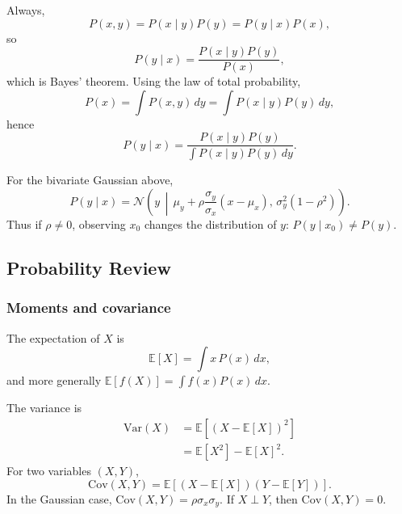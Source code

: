 \documentclass[11pt, titlepage]{article} %
\numberwithin{equation}{section}
\theoremstyle{definition}
\numberwithin{assumption}{section}
\begin{document}
Always,
\begin{equation*}
    P(x,y)=P(x\mid y)P(y)=P(y\mid x)P(x),
\end{equation*}
so
\begin{equation*}
    P(y\mid x)=\frac{P(x\mid y)P(y)}{P(x)},
\end{equation*}
which is Bayes' theorem. Using the law of total probability,
\begin{equation*}
    P(x)=\int P(x,y)\,dy=\int P(x\mid y)P(y)\,dy,
\end{equation*}
hence
\begin{equation*}
    P(y\mid x)=\frac{P(x\mid y)P(y)}{\int P(x\mid y)P(y)\,dy}.
\end{equation*}

For the bivariate Gaussian above,
\begin{equation*}
    P(y\mid x)=
    \mathcal{N}\!\left(
    y \,\middle|\,
    \mu_y+\rho\frac{\sigma_y}{\sigma_x}(x-\mu_x),\,
    \sigma_y^2(1-\rho^2)
    \right).
\end{equation*}
Thus if $\rho\ne 0$, observing $x_0$ changes the distribution of $y$: $P(y\mid x_0)\ne P(y)$.

\subsection{Probability Review}

\subsubsection*{Moments and covariance}

The expectation of $X$ is
\begin{equation*}
    \mathbb{E}[X]=\int x\,P(x)\,dx,
\end{equation*}
and more generally $\mathbb{E}[f(X)]=\int f(x)P(x)\,dx$.

The variance is
\begin{align*}
    \mathrm{Var}(X)
    &=\mathbb{E}\!\left[(X-\mathbb{E}[X])^2\right]\\
    &=\mathbb{E}[X^2]-\mathbb{E}[X]^2.
\end{align*}
For two variables $(X,Y)$,
\begin{equation*}
    \mathrm{Cov}(X,Y)=\mathbb{E}\!\left[(X-\mathbb{E}[X])(Y-\mathbb{E}[Y])\right].
\end{equation*}
In the Gaussian case, $\mathrm{Cov}(X,Y)=\rho \sigma_x\sigma_y$. If $X\perp Y$, then $\mathrm{Cov}(X,Y)=0$.
\end{document}
